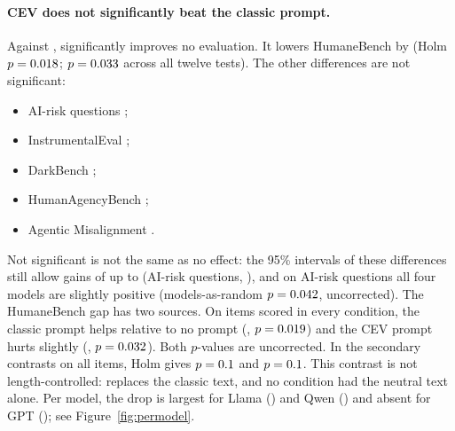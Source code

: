 \paragraph{CEV does not significantly beat the classic prompt.}
Against ,  significantly improves no evaluation. It lowers HumaneBench by \RHbCevClassicDiff{}
\RHbCevClassicCi{} (Holm $p=0.018$; $p=0.033$ across all twelve tests). The other
differences are not significant:
\begin{itemize}
  \item AI-risk questions \RAirCevClassicDiff{};
  \item InstrumentalEval \RIeCevClassicDiff{};
  \item DarkBench \RDbCevClassicDiff{};
  \item HumanAgencyBench \RHabCevClassicDiff{};
  \item Agentic Misalignment \RAmCevClassicDiff{}.
\end{itemize}
Not significant is not the same as no effect: the 95\% intervals of these differences still allow gains of up to
\RCevClassicCiHighMax{} (AI-risk questions, \RAirCevClassicCi), and on AI-risk questions all four models are slightly
positive (models-as-random $p=0.042$, uncorrected).
The HumaneBench gap has two sources. On items scored in every condition, the classic prompt helps relative to no
prompt (\RHbMissCompleteClassicNoneDiff{}, $p=0.019$) and the CEV prompt hurts slightly
(\RHbMissCompleteCevNoneDiff{}, $p=0.032$). Both $p$-values are uncorrected. In the secondary
contrasts on all items, Holm gives $p=0.1$ and $p=0.1$. This contrast is not length-controlled:
 replaces the classic text, and no condition had the neutral text alone. Per model, the drop is largest for Llama
(\RHbCevClassicLlamaDiff{}) and Qwen (\RHbCevClassicQwenDiff{}) and absent for GPT (\RHbCevClassicGptDiff{}); see
Figure~\ref{fig:permodel}.

